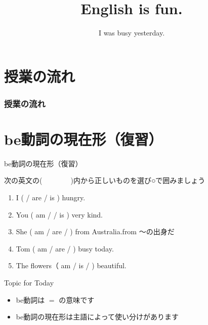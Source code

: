 \documentclass[aspectratio=169,xcolor={dvipsnames,table}]{beamer}
\title{English is fun.}
\subtitle{I was busy yesterday.}
\author{}
\institute[]{}
\date[]
\newcommand{\myaudio}[1]{\href{#1}{\faVolumeUp}}
\begin{document}
\begin{frame}[plain]
  \titlepage
\end{frame}

\section*{授業の流れ}
\begin{frame}[plain]
  \frametitle{授業の流れ}
  \tableofcontents
\end{frame}


\section{be動詞の現在形（復習）}

\begin{frame}[plain]{be動詞の現在形（復習）}

次の英文の(~~~~~~~~)内から正しいものを選び○で囲みましょう

\begin{enumerate}
 \item I (  / are  / is ) hungry.
 \item You ( am /  / is ) very kind.
 \item She ( am / are /  ) from Australia.\hfill{\scriptsize from ～の出身だ}
 \item Tom ( am / are /  ) busy today.
 \item The flowers（ am / is /  ) beautiful.
\end{enumerate}

\hfill{\scriptsize \myaudio{./audio/024_past_be_01.mp3}}

\begin{block}{Topic for Today}
\pause
\begin{itemize}[square]\small
 \item be動詞は $=$ の意味です
 \item be動詞の現在形は主語によって使い分けがあります
\end{itemize}
     \end{block}

\end{frame}
\end{document}
